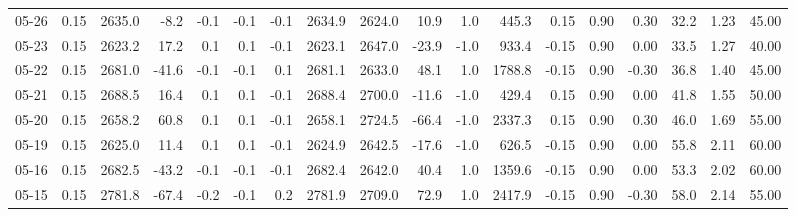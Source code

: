 \begin{threeparttable}
{\begin{tabular}{lrrrrrrrrrrrrrrrrr}
  05-26 &     0.15 & 2635.0 &              -8.2 &              -0.1 &               -0.1 &               -0.1 & 2634.9 & 2624.0 &       10.9 &                      1.0 &               445.3 &       0.15 &      0.90 &           0.30 &             32.2 &            1.23 &                  45.00 \\
  05-23 &     0.15 & 2623.2 &              17.2 &               0.1 &                0.1 &               -0.1 & 2623.1 & 2647.0 &      -23.9 &                     -1.0 &               933.4 &      -0.15 &      0.90 &           0.00 &             33.5 &            1.27 &                  40.00 \\
  05-22 &     0.15 & 2681.0 &             -41.6 &              -0.1 &               -0.1 &                0.1 & 2681.1 & 2633.0 &       48.1 &                      1.0 &              1788.8 &      -0.15 &      0.90 &          -0.30 &             36.8 &            1.40 &                  45.00 \\
  05-21 &     0.15 & 2688.5 &              16.4 &               0.1 &                0.1 &               -0.1 & 2688.4 & 2700.0 &      -11.6 &                     -1.0 &               429.4 &       0.15 &      0.90 &           0.00 &             41.8 &            1.55 &                  50.00 \\
  05-20 &     0.15 & 2658.2 &              60.8 &               0.1 &                0.1 &               -0.1 & 2658.1 & 2724.5 &      -66.4 &                     -1.0 &              2337.3 &       0.15 &      0.90 &           0.30 &             46.0 &            1.69 &                  55.00 \\
  05-19 &     0.15 & 2625.0 &              11.4 &               0.1 &                0.1 &               -0.1 & 2624.9 & 2642.5 &      -17.6 &                     -1.0 &               626.5 &      -0.15 &      0.90 &           0.00 &             55.8 &            2.11 &                  60.00 \\
  05-16 &     0.15 & 2682.5 &             -43.2 &              -0.1 &               -0.1 &               -0.1 & 2682.4 & 2642.0 &       40.4 &                      1.0 &              1359.6 &      -0.15 &      0.90 &           0.00 &             53.3 &            2.02 &                  60.00 \\
  05-15 &     0.15 & 2781.8 &             -67.4 &              -0.2 &               -0.1 &                0.2 & 2781.9 & 2709.0 &       72.9 &                      1.0 &              2417.9 &      -0.15 &      0.90 &          -0.30 &             58.0 &            2.14 &                  55.00 \\

\end{tabular}}
\end{threeparttable}
